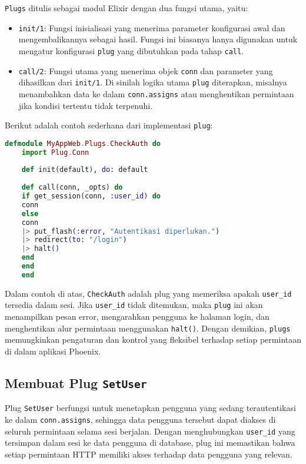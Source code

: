 \texttt{Plugs} ditulis sebagai modul Elixir dengan dua fungsi utama, yaitu:
\begin{itemize}
	\item \texttt{init/1}: Fungsi inisialisasi yang menerima parameter konfigurasi awal dan mengembalikannya sebagai hasil. Fungsi ini biasanya hanya digunakan untuk mengatur konfigurasi \texttt{plug} yang dibutuhkan pada tahap \texttt{call}.
	\item \texttt{call/2}: Fungsi utama yang menerima objek \texttt{conn} dan parameter yang dihasilkan dari \texttt{init/1}. Di sinilah logika utama \texttt{plug} diterapkan, misalnya menambahkan data ke dalam \texttt{conn.assigns} atau menghentikan permintaan jika kondisi tertentu tidak terpenuhi.
\end{itemize}

Berikut adalah contoh sederhana dari implementasi \texttt{plug}:

\begin{lstlisting}[language=Elixir, caption={Contoh Implementasi Plug Sederhana}]
	defmodule MyAppWeb.Plugs.CheckAuth do
	import Plug.Conn
	
	def init(default), do: default
	
	def call(conn, _opts) do
	if get_session(conn, :user_id) do
	conn
	else
	conn
	|> put_flash(:error, "Autentikasi diperlukan.")
	|> redirect(to: "/login")
	|> halt()
	end
	end
	end
\end{lstlisting}

Dalam contoh di atas, \texttt{CheckAuth} adalah plug yang memeriksa apakah \texttt{user\_id} tersedia dalam sesi. Jika \texttt{user\_id} tidak ditemukan, maka \texttt{plug} ini akan menampilkan pesan error, mengarahkan pengguna ke halaman login, dan menghentikan alur permintaan menggunakan \texttt{halt()}. Dengan demikian, \texttt{plugs} memungkinkan pengaturan dan kontrol yang fleksibel terhadap setiap permintaan di dalam aplikasi Phoenix.

\subsection{Membuat Plug \texttt{SetUser}}
Plug \texttt{SetUser} berfungsi untuk menetapkan pengguna yang sedang terautentikasi ke dalam \texttt{conn.assigns}, sehingga data pengguna tersebut dapat diakses di seluruh permintaan selama sesi berjalan. Dengan menghubungkan \texttt{user\_id} yang tersimpan dalam sesi ke data pengguna di database, plug ini memastikan bahwa setiap permintaan HTTP memiliki akses terhadap data pengguna yang relevan.

